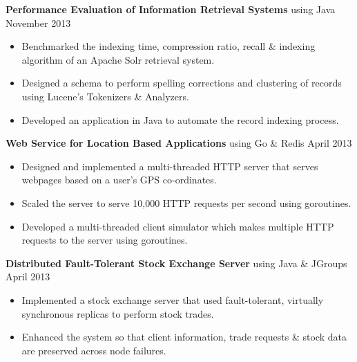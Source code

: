 \documentclass[10pt, letterpaper]{article}
\begin{document}
\textbf{Performance Evaluation of Information Retrieval Systems} using Java \hfill November 2013
\begin{itemize}
    \item Benchmarked the indexing time, compression ratio, recall \& indexing 
algorithm of an Apache Solr retrieval system.
    \item Designed a schema to perform spelling corrections and clustering of 
records using Lucene's Tokenizers \& Analyzers.
    \item Developed an application in Java to automate the record indexing process.
\end{itemize}

\textbf{Web Service for Location Based Applications} using Go \& Redis \hfill April 2013
\begin{itemize}
    \item Designed and implemented a multi-threaded HTTP server that serves webpages
based on a user's GPS co-ordinates.
    \item Scaled the server to serve 10,000 HTTP requests per second using goroutines.
    \item Developed a multi-threaded client simulator which makes multiple HTTP requests
to the server using goroutines.
\end{itemize}


\textbf{Distributed Fault-Tolerant Stock Exchange Server} using Java \& JGroups \hfill April 2013
\begin{itemize}
    \item Implemented a stock exchange server that used fault-tolerant, virtually synchronous replicas to perform stock trades.
    \item Enhanced the system so that client information, trade requests \& stock data are preserved across node failures. %
\end{itemize}
\end{document}
